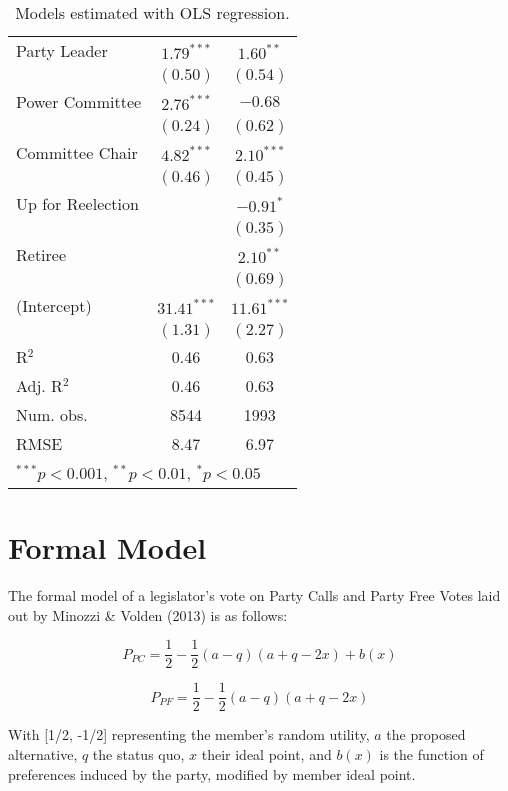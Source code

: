 \documentclass[12pt]{article}
\newcommand\fnote[1]{\captionsetup{font=small}\caption*{#1}}
\begin{document}
\begin{table}[H]
\begin{center}
\begin{tabular}{l c c }
			Party Leader                 & $1.79^{***}$  & $1.60^{**}$   \\
			& $(0.50)$      & $(0.54)$      \\
			Power Committee       & $2.76^{***}$  & $-0.68$       \\
			& $(0.24)$      & $(0.62)$      \\
			Committee Chair                  & $4.82^{***}$  & $2.10^{***}$  \\
			& $(0.46)$      & $(0.45)$      \\
			Up for Reelection    &               & $-0.91^{*}$   \\
			&               & $(0.35)$      \\
			Retiree                &               & $2.10^{**}$   \\
			&               & $(0.69)$      \\
			(Intercept)            & $31.41^{***}$ & $11.61^{***}$ \\
			& $(1.31)$      & $(2.27)$      \\
			\hline
			R$^2$                  & 0.46          & 0.63          \\
			Adj. R$^2$             & 0.46          & 0.63          \\
			Num. obs.              & 8544          & 1993          \\
			RMSE                   & 8.47          & 6.97          \\
			\hline
			\multicolumn{3}{l}{\scriptsize{$^{***}p<0.001$, $^{**}p<0.01$, $^*p<0.05$}}
		\end{tabular}
	\fnote{Models estimated with OLS regression.}
	\end{center}
\end{table}

\pagebreak

\section{Formal Model}

The formal model of a legislator's vote on Party Calls and Party Free Votes laid out by Minozzi \& Volden (2013) is as follows:

$$ P_{PC} = \dfrac{1}{2} - \dfrac{1}{2} (a - q) (a + q - 2x) + b(x)  $$

$$ P_{PF} = \dfrac{1}{2} - \dfrac{1}{2} (a - q) (a + q - 2x) $$

With [1/2, -1/2] representing the member's random utility, $ a $ the proposed alternative, $ q $ the status quo, $ x $ their ideal point, and $ b(x) $ is the function of preferences induced by the party, modified by member ideal point.
\end{document}
